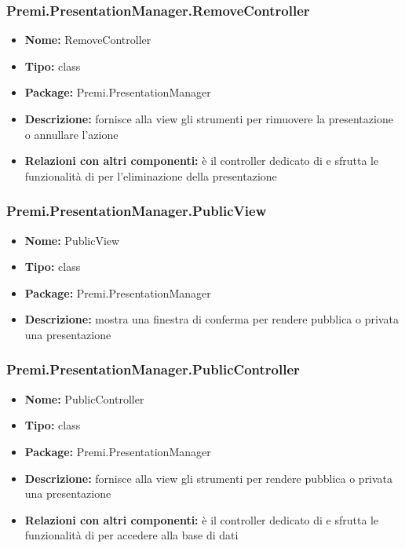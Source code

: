 \subsubsection{Premi.PresentationManager.RemoveController}
\begin{itemize}
  \item \textbf{Nome:} RemoveController
  \item \textbf{Tipo:} class
  \item \textbf{Package:} Premi.PresentationManager
  \item \textbf{Descrizione:} fornisce alla view gli strumenti per rimuovere la presentazione o annullare l'azione
  \item \textbf{Relazioni con altri componenti:} è il controller dedicato di   e sfrutta le funzionalità di  per l'eliminazione della presentazione 
\end{itemize}
\subsubsection{Premi.PresentationManager.PublicView}
\begin{itemize}
  \item \textbf{Nome:} PublicView
  \item \textbf{Tipo:} class
  \item \textbf{Package:} Premi.PresentationManager
  \item \textbf{Descrizione:} mostra una finestra di conferma per rendere pubblica o privata una presentazione
\end{itemize}
\subsubsection{Premi.PresentationManager.PublicController}
\begin{itemize}
  \item \textbf{Nome:} PublicController
  \item \textbf{Tipo:} class
  \item \textbf{Package:} Premi.PresentationManager
  \item \textbf{Descrizione:} fornisce alla view gli strumenti per rendere pubblica o privata una presentazione
  \item \textbf{Relazioni con altri componenti:} è il controller dedicato di   e sfrutta le funzionalità di  per accedere alla base di dati
\end{itemize}
